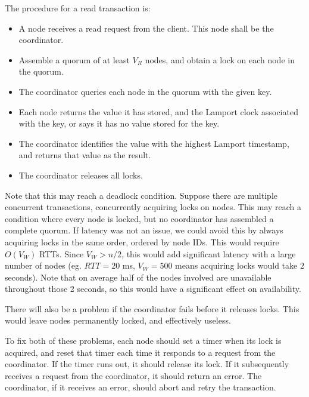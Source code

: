 \documentclass[12pt,a4paper,twoside,openright]{report}
\begin{document}
The procedure for a read transaction is:

\begin{itemize}
  \item
  A node receives a read request from the client. This node shall be the coordinator.

  \item
  Assemble a quorum of at least $V_R$ nodes, and obtain a lock on each node in the quorum.

  \item
  The coordinator queries each node in the quorum with the given key.

  \item
  Each node returns the value it has stored, and the Lamport clock associated with the key, or says it has no value stored for the key.

  \item
  The coordinator identifies the value with the highest Lamport timestamp, and returns that value as the result.

  \item
  The coordinator releases all locks.

\end{itemize}

Note that this may reach a deadlock condition. Suppose there are multiple concurrent transactions, concurrently acquiring locks on nodes. This may reach a condition where every node is locked, but no coordinator has assembled a complete quorum. If latency was not an issue, we could avoid this by always acquiring locks in the same order, ordered by node IDs. This would require $O(V_W)$ RTTs. Since $V_W > n / 2$, this would add significant latency with a large number of nodes (eg. $RTT = 20$ ms, $V_W = 500$ means acquiring locks would take $2$ seconds). Note that on average half of the nodes involved are unavailable throughout those 2 seconds, so this would have a significant effect on availability.

There will also be a problem if the coordinator fails before it releases locks. This would leave nodes permanently locked, and effectively useless.

To fix both of these problems, each node should set a timer when its lock is acquired, and reset that timer each time it responds to a request from the coordinator. If the timer runs out, it should release its lock. If it subsequently receives a request from the coordinator, it should return an error. The coordinator, if it receives an error, should abort and retry the transaction.
\end{document}
